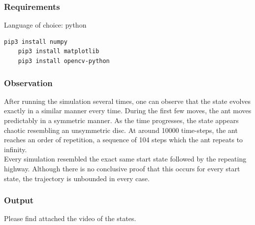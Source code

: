\subsubsection{Requirements}
Language of choice: python
\begin{lstlisting}[language=bash]
	pip3 install numpy
	pip3 install matplotlib
	pip3 install opencv-python
\end{lstlisting}

\subsubsection{Observation}
After running the simulation several times, one can observe that the state evolves exactly in a similar manner every time. During the first few moves, the ant moves predictably in a symmetric manner. As the time progresses, the state appears chaotic resembling an unsymmetric disc. At around 10000 time-steps, the ant reaches an order of repetition, a sequence of 104 steps which the ant repeats to infinity. \\
Every simulation resembled the exact same start state followed by the repeating highway. Although there is no conclusive proof that this occurs for every start state, the trajectory is unbounded in every case.

\subsubsection{Output}
Please find attached the video of the states.

